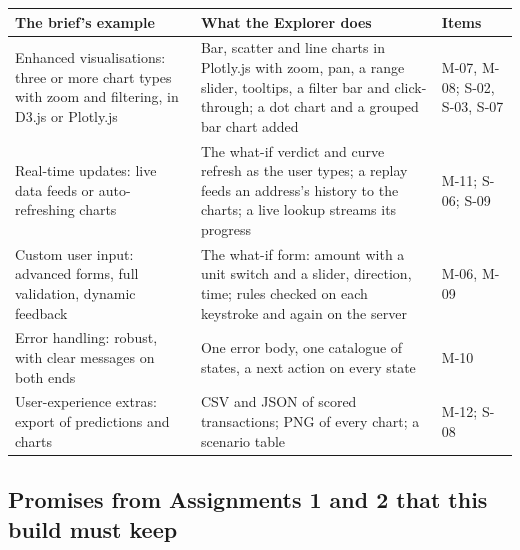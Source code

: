 \begin{center}
\small
\begin{tabularx}{\textwidth}{@{}L{4.6cm}Y L{2.4cm}@{}}
\toprule
\textbf{The brief's example} & \textbf{What the Explorer does} & \textbf{Items} \\
\midrule
Enhanced visualisations: three or more chart types with zoom and filtering, in D3.js or Plotly.js & Bar, scatter and line charts in Plotly.js with zoom, pan, a range slider, tooltips, a filter bar and click-through; a dot chart and a grouped bar chart added & M-07, M-08; S-02, S-03, S-07 \\
Real-time updates: live data feeds or auto-refreshing charts & The what-if verdict and curve refresh as the user types; a replay feeds an address's history to the charts; a live lookup streams its progress & M-11; S-06; S-09 \\
Custom user input: advanced forms, full validation, dynamic feedback & The what-if form: amount with a unit switch and a slider, direction, time; rules checked on each keystroke and again on the server & M-06, M-09 \\
Error handling: robust, with clear messages on both ends & One error body, one catalogue of states, a next action on every state & M-10 \\
User-experience extras: export of predictions and charts & CSV and JSON of scored transactions; PNG of every chart; a scenario table & M-12; S-08 \\
\bottomrule
\end{tabularx}
\end{center}

\subsection{Promises from Assignments 1 and 2 that this build must keep}
\label{sec:promises}

